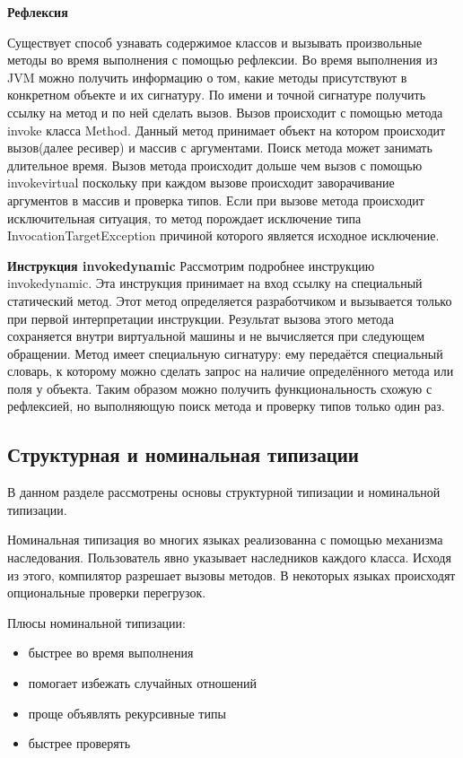 \documentclass{spbau-diploma}
\begin{document}
\textbf{Рефлексия}

Существует способ узнавать содержимое классов и вызывать произвольные методы во время выполнения с помощью рефлексии. Во время выполнения из JVM можно получить информацию о том, какие методы присутствуют в конкретном объекте и их сигнатуру. По имени и точной сигнатуре получить ссылку на метод и по ней сделать вызов. Вызов происходит с помощью метода invoke класса Method. Данный метод принимает объект на котором происходит вызов(далее ресивер) и массив с аргументами. Поиск метода может занимать длительное время. Вызов метода происходит дольше чем вызов с помощью invokevirtual поскольку при каждом вызове происходит заворачивание аргументов в массив и проверка типов. Если при вызове метода происходит исключительная ситуация, то метод порождает исключение типа InvocationTargetException причиной которого является исходное исключение.

\textbf{Инструкция invokedynamic}
Рассмотрим подробнее инструкцию invokedynamic. Эта инструкция принимает на вход ссылку на специальный статический метод. Этот метод определяется разработчиком и вызывается только при первой интерпретации инструкции. Результат вызова этого метода сохраняется внутри виртуальной машины и не вычисляется при следующем обращении. Метод имеет специальную сигнатуру: ему передаётся специальный словарь, к которому можно сделать запрос на наличие определённого метода или поля у объекта. Таким образом можно получить функциональность схожую с рефлексией, но выполняющую поиск метода и проверку типов только один раз.

\subsection{Структурная и номинальная типизации}
В данном разделе рассмотрены основы структурной типизации и номинальной типизации.

Номинальная типизация во многих языках реализованна с помощью механизма наследования. Пользователь явно указывает наследников каждого класса. Исходя из этого, компилятор разрешает вызовы методов. В некоторых языках происходят опциональные проверки перегрузок.

Плюсы номинальной типизации:
\begin{itemize}
    \item быстрее во время выполнения
    \item помогает избежать случайных отношений
    \item проще объявлять рекурсивные типы
    \item быстрее проверять
\end{itemize}
\end{document}
